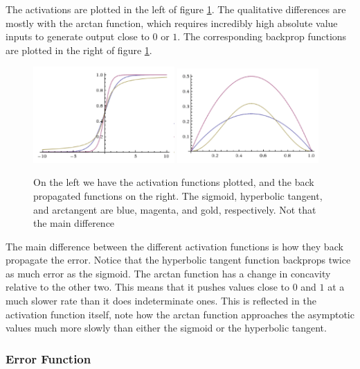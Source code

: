 \documentclass[prl,amsmath,amssymb,floatfix,superscriptaddress,notitlepage,twocolumn]{revtex4}
\begin{document}
The activations are plotted in the left of figure \ref{AF10}. The qualitative differences are mostly with the arctan function, which requires incredibly high absolute value inputs to generate output close to $0$ or $1$. The corresponding backprop functions are plotted in the right of figure \ref{AF10}.

\begin{figure}[ht!]
\label{AF10}
\centering
\includegraphics[width=0.48\textwidth]{ActivationFunctions.png}\hfill
\includegraphics[width=0.48\textwidth]{BackPropActivationFunctions.png}
\caption{On the left we have the activation functions plotted, and the back propagated functions on the right. The sigmoid, hyperbolic tangent, and arctangent are blue, magenta, and gold, respectively. Not that the main difference }
\end{figure}


The main difference between the different activation functions is how they back propagate the error. Notice that the hyperbolic tangent function backprops twice as much error as the sigmoid. The arctan function has a change in concavity relative to the other two. This means that it pushes values close to $0$ and $1$ at a much slower rate than it does indeterminate ones. This is reflected in the activation function itself, note how the arctan function approaches the asymptotic values much more slowly than either the sigmoid or the hyperbolic tangent. 


\subsubsection{Error Function}
\end{document}
